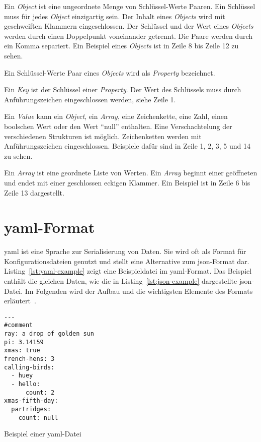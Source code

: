 \begin{description}
    \setlength\itemsep{-0.5cm}
    \item[Object]
          Ein \textit{Object} ist eine ungeordnete Menge von Schlüssel-Werte Paaren. Ein Schlüssel muss für jedes \textit{Object} einzigartig sein.
          Der Inhalt eines \textit{Objects} wird mit geschweiften Klammern eingeschlossen. Der Schlüssel und der Wert eines \textit{Objects} werden durch einen
          Doppelpunkt voneinander getrennt. Die Paare werden durch ein Komma separiert. Ein Beispiel eines \textit{Objects} ist in Zeile 8 bis Zeile 12 zu sehen.
    \item[Property] Ein Schlüssel-Werte Paar eines \textit{Objects} wird als \textit{Property} bezeichnet.
    \item[Key] Ein \textit{Key} ist der Schlüssel einer \textit{Property}. Der Wert des Schlüssels muss durch Anführungszeichen eingeschlossen werden, siehe Zeile 1.
    \item[Value] Ein \textit{Value} kann ein \textit{Object}, ein \textit{Array}, eine Zeichenkette, eine Zahl, einen boolschen Wert oder den Wert ``null''
          enthalten. Eine Verschachtelung der verschiedenen Strukturen ist möglich. Zeichenketten werden mit Anführungszeichen eingeschlossen.
          Beispiele dafür sind in Zeile 1, 2, 3, 5 und 14 zu sehen.
    \item[Array]
          Ein \textit{Array} ist eine geordnete Liste von Werten. Ein \textit{Array} beginnt einer geöffneten und endet mit einer geschlossen eckigen Klammer.
          Ein Beispiel ist in Zeile 6 bis Zeile 13 dargestellt.
\end{description}



\section{\acs{yaml}-Format}\label{sec:yaml-format}

\ac{yaml} ist eine Sprache zur Serialisierung von Daten. Sie wird oft als Format für Konfigurationsdateien genutzt
und stellt eine Alternative zum \acs{json}-Format dar.
Listing~\ref{lst:yaml-example} zeigt eine Beispieldatei im \ac{yaml}-Format. Das Beispiel enthält die gleichen Daten, wie die
in Listing~\ref{lst:json-example} dargestellte \acs{json}-Datei.
Im Folgenden wird der Aufbau und die wichtigsten Elemente des Formats erläutert~\cite{yaml-spacelift,yaml-cloudbees,yaml-javatpoint}.

\begin{listing}[htp]
    \begin{verbatim}
---
#comment
ray: a drop of golden sun
pi: 3.14159
xmas: true
french-hens: 3
calling-birds:
  - huey
  - hello:
      count: 2
xmas-fifth-day:
  partridges:
    count: null
      \end{verbatim}
    \caption{Beispiel einer \acs{yaml}-Datei}
    \label{lst:yaml-example}
\end{listing}

